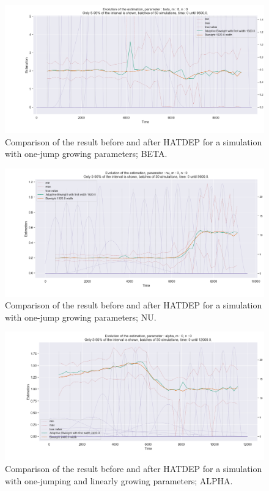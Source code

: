 \begin{figure}
\centering
\includegraphics[width = 0.90 \textwidth]{../imag/chap3/2_bis/Q.png}
\caption{Comparison of the result before and after HATDEP for a simulation with one-jump growing parameters; BETA.}
\label{fig:second_estimate_2_beta}
\end{figure}

\begin{figure}
\centering
\includegraphics[width = 0.90 \textwidth]{../imag/chap3/2_bis/R.png}
\caption{Comparison of the result before and after HATDEP for a simulation with one-jump growing parameters; NU.}
\label{fig:second_estimate_2_nu}
\end{figure}






\begin{figure}
\centering
\includegraphics[width = 0.90 \textwidth]{../imag/chap3/3_bis/P.png}
\caption{Comparison of the result before and after HATDEP for a simulation with one-jumping and linearly growing parameters; ALPHA.}
\label{fig:second_estimate_3_alpha}
\end{figure}

